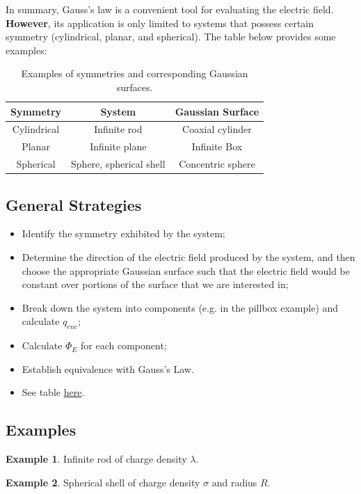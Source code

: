 \documentclass[11pt, letterpaper]{article}
\begin{document}
	In summary, Gauss's law is a convenient tool for evaluating the electric field. \textbf{However},
	its application is only limited to systems that possess certain symmetry (cylindrical, planar,
	and spherical). The table below provides some examples:
	\begin{table}[h!]
	\centering
	\begin{tabular}{||c | c | c||}
	\hline
	\textbf{Symmetry} & 	\textbf{System} & \textbf{Gaussian Surface}\\
	\hline\hline
	Cylindrical & Infinite rod & Coaxial cylinder\\
	\hline
	Planar & Infinite plane & Infinite Box\\
	\hline
	Spherical & Sphere, spherical shell & Concentric sphere\\ \hline
	
	
	\end{tabular}		
	\caption{\label{tab:geometries}Examples of symmetries and corresponding Gaussian
	surfaces.}
	
	\end{table}
	
	\subsection{General Strategies}
	\begin{itemize}
		\item Identify the symmetry exhibited by the system;
		\item Determine the direction of the electric field produced by the system, and then 
		choose the appropriate Gaussian surface such that the electric field would be 
		constant over portions of the surface that we are interested in;
		\item Break down the system into components (e.g. in the pillbox example) and calculate
		$q_{enc}$;
		\item Calculate $\Phi_E$ for each component;
		\item Establish equivalence with Gauss's Law.
		\item See table \hyperlink{subsection.4.1}{here}.
	\end{itemize}
	
	\subsection{Examples}
	\textbf{Example 1}. Infinite rod of charge density $\lambda$.
	
	\textbf{Example 2}. Spherical shell of charge density $\sigma$ and radius $R$.
	
\end{document}
